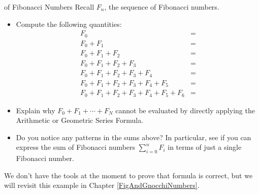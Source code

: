 \begin{exercise}{ of Fibonacci Numbers \Coffeecup \Coffeecup \Coffeecup}\label{Lieonacci}
Recall $F_n$, the sequence of Fibonacci numbers. 
\begin{itemize} 
\item Compute the following quantities:
\begin{align*}
F_0&=\\
F_0+F_1&=\\
F_0+F_1+F_2&=\\
F_0+F_1+F_2+F_3&=\\
F_0+F_1+F_2+F_3+F_4&=\\
F_0+F_1+F_2+F_3+F_4+F_5&=\\
F_0+F_1+F_2+F_3+F_4+F_5+F_6&=
\end{align*}

\item Explain why $F_0+F_1+\cdots+F_N$ cannot be evaluated by directly applying the Arithmetic or Geometric Series Formula.


\item Do you notice any patterns in the sums above?  In particular, see if you can express the sum of Fibonacci numbers $\sum_{i=0}^n F_i$ in terms of just a single Fibonacci number.

\end{itemize}
\end{exercise}
We don't have the tools at the moment to prove that formula is correct, but we will revisit this example in Chapter \ref{FigAndGnocchiNumbers}.
